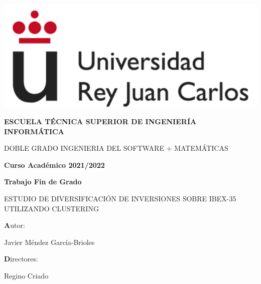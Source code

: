 \documentclass[12pt,a4paper]{article}
\begin{document}
\begin{titlepage}
	\centering
	{\includegraphics[scale=0.5]{logo}\par}
	\vspace{1cm}
	{\bfseries\large ESCUELA TÉCNICA SUPERIOR DE INGENIERÍA INFORMÁTICA \par}
	\vspace{1cm}
	{\scshape\large DOBLE GRADO INGENIERIA DEL SOFTWARE + MATEMÁTICAS\par}
	\vspace{1cm}
	{\bfseries\large Curso Académico 2021/2022 \par}
	\vspace{1cm}
	{\bfseries\large  Trabajo Fin de Grado \par}
	\vspace{2cm}
	{\scshape\large ESTUDIO DE DIVERSIFICACIÓN DE INVERSIONES SOBRE IBEX-35 UTILIZANDO CLUSTERING\par}
	\vspace{2cm}
	\vfill
	{\normalsize\textbf Autor: \par}
	{\normalsize Javier Méndez García-Brioles \par}
	{\normalsize\textbf Directores: \par}
	{\normalsize Regino Criado \par}
\end{titlepage}





	\vspace{1cm}
	\tableofcontents

\pagebreak
	
	\vspace{1cm}
\end{document}
